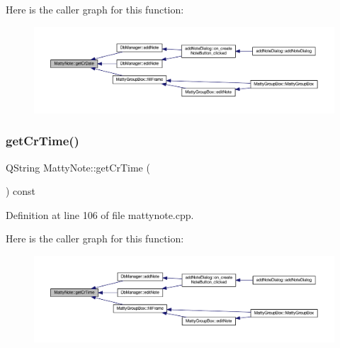 Here is the caller graph for this function\+:
\nopagebreak
\begin{figure}[H]
\begin{center}
\leavevmode
\includegraphics[width=350pt]{classMattyNote_aed32bd27ebe176f3cedbc676a03f15ea_icgraph}
\end{center}
\end{figure}
\hypertarget{classMattyNote_a37fbcf1e6b2edbda791240593a04b919}{}\label{classMattyNote_a37fbcf1e6b2edbda791240593a04b919} 
\subsubsection{\texorpdfstring{get\+Cr\+Time()}{getCrTime()}}
{\footnotesize\ttfamily Q\+String Matty\+Note\+::get\+Cr\+Time (\begin{DoxyParamCaption}{ }\end{DoxyParamCaption}) const}



Definition at line 106 of file mattynote.\+cpp.

Here is the caller graph for this function\+:
\nopagebreak
\begin{figure}[H]
\begin{center}
\leavevmode
\includegraphics[width=350pt]{classMattyNote_a37fbcf1e6b2edbda791240593a04b919_icgraph}
\end{center}
\end{figure}
\hypertarget{classMattyNote_a9d4ed47006ca671ff80037c2c0c96064}{}\label{classMattyNote_a9d4ed47006ca671ff80037c2c0c96064} 
